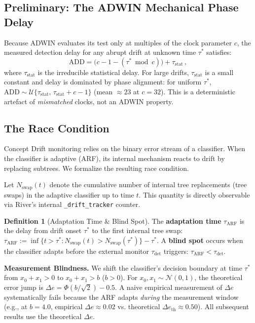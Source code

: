 \documentclass[10pt,conference]{IEEEtran}
\theoremstyle{definition}
\newtheorem{definition}[theorem]{Definition}
\begin{document}
\subsection{Preliminary: The ADWIN Mechanical Phase Delay}\label{sec:clock}

Because ADWIN evaluates its test only at multiples of the clock parameter $c$, the measured detection delay for any abrupt drift at unknown time $\tau^*$ satisfies:
\begin{equation}\label{eq:clock}
  \mathrm{ADD} = \bigl(c - 1 - (\tau^* \bmod c)\bigr) + \tau_{\mathrm{stat}}\,,
\end{equation}
where $\tau_{\mathrm{stat}}$ is the irreducible statistical delay. For large drifts, $\tau_{\mathrm{stat}}$ is a small constant and delay is dominated by phase alignment: for uniform $\tau^*$, $\mathrm{ADD} \sim \mathcal{U}\{\tau_{\mathrm{stat}},\, \tau_{\mathrm{stat}} + c - 1\}$ (mean ${\approx}23$ at $c{=}32$). This is a deterministic artefact of \emph{mismatched} clocks, not an ADWIN property.

\subsection{The Race Condition}\label{sec:race}

Concept Drift monitoring relies on the binary error stream of a classifier.
When the classifier is adaptive (ARF), its internal mechanism reacts to drift by replacing subtrees.
We formalize the resulting race condition.

Let $N_{\mathrm{swap}}(t)$ denote the cumulative number of internal tree replacements (tree swaps) in the adaptive classifier up to time $t$. This quantity is directly observable via River's internal \texttt{\_drift\_tracker} counter.

\begin{definition}[Adaptation Time \& Blind Spot]\label{def:tau_arf}
  The \textbf{adaptation time} $\tau_{\mathrm{ARF}}$ is the delay from drift onset $\tau^*$ to the first internal tree swap: $\tau_{\mathrm{ARF}} := \inf\bigl\{t > \tau^* : N_{\mathrm{swap}}(t) > N_{\mathrm{swap}}(\tau^*) \bigr\} - \tau^*$.
  A \textbf{blind spot} occurs when the classifier adapts before the external monitor $\tau_{\mathrm{det}}$ triggers: $\tau_{\mathrm{ARF}} < \tau_{\mathrm{det}}$.
\end{definition}

\noindent\textbf{Measurement Blindness.}
We shift the classifier's decision boundary at time $\tau^*$ from $x_0 + x_1 > 0$ to $x_0 + x_1 > b$ ($b > 0$).
For $x_0, x_1 \sim \mathcal{N}(0,1)$, the theoretical error jump is $\Delta e = \Phi(b/\sqrt{2}) - 0.5$. A naive empirical measurement of $\Delta e$ systematically fails because the ARF adapts \emph{during} the measurement window (e.g., at $b = 4.0$, empirical $\Delta e \approx 0.02$ vs. theoretical $\Delta e_{\mathrm{th}} \approx 0.50$). All subsequent results use the theoretical $\Delta e$.
\end{document}

